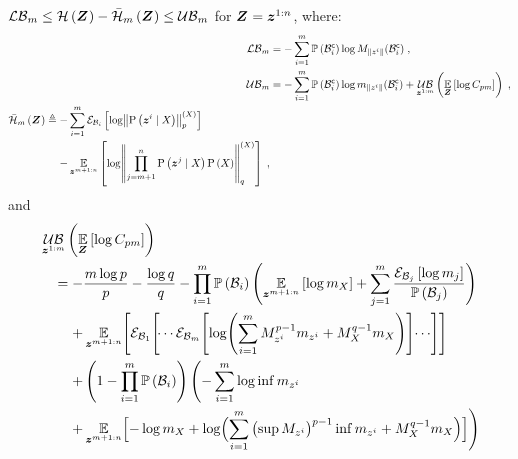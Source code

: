 \begin{proposition}
	\label{thm:normalizer_bounds_struct}
	$\operatorname*{\mathcal{LB}}_m\leq\mathcal{H}\left({\boldsymbol Z_{}}\right) -\bar{\mathcal{H}}_{m}\left({\boldsymbol Z_{}}\right)\leq\operatorname*{\mathcal{UB}}_m$ for $\boldsymbol Z_{}=\boldsymbol z_{}^{1:n}$, where:
	\begin{subequations}
		\begin{align}
			\lowerbound\nolimits_m & =-\sum_{i=1}^m\measure{\stcompI{\subSpace}{i}}\log M_{\norm{\observation{}{i}}}(\stcompI{\subSpace}{i})\;, \\
			\upperbound\nolimits_m & =-\sum_{i=1}^m\measure{\stcompI{\subSpace}{i}}\log m_{\norm{\observation{}{i}}}(\stcompI{\subSpace}{i})+\upperbound_{\observationRV{}{1:m}}\left(\expectation{\log C_{pm}}{\observationsRV{}}\right)\;,\\
			\begin{split}
				\simplentropy{\observationsRV{}}{m} & \triangleq-\sum_{i=1}^m\partialexpectation{\log\pnorm{\probcond{\observationRV{}{i}}{\states{}}}{p}{\states{}}}{\subSpace_i}\\
				&\phantomeq-\expectation{\log\pnorm{\prod_{j=m+1}^n\probcond{\observationRV{}{j}}{\states{}}\prob{\states{}}}{q}{\states{}}}{\observationRV{}{m+1:n}}\;,
			\end{split}
		\end{align}
	\end{subequations}
	and
	\begin{equation}
		\begin{split}
			& \upperbound_{\observationRV{}{1:m}}\left(\expectation{\log C_{pm}}{\observationsRV{}}\right)\\
			& \quad=-\frac{m\log p}{p}-\frac{\log q}{q}
			-\prod_{i=1}^m\measure{\subSpace_i}\Biggl(\expectation{\log m_{\states{}}}{\observationRV{}{m+1:n}}+\sum_{j=1}^m\frac{\partialexpectation{\log m_j}{\subSpace_j}}{\measure{\subSpace_j}}\Biggr) \\
			& \quad\phantomeq+\E_{\observationRV{}{m+1:n}}\Biggl[\partexp_{\subSpace_1}\Biggl[\dotsi\partexp_{\subSpace_m}\Biggl[
			\log \Biggl(\sum_{i=1}^{m} M_{\observation{}{i}}^{p-1}m_{\observation{}{i}}
			+M_{\states{}}^{q-1}m_{\states{}}\Biggr)\Biggr]\dotsi\Biggr]\Biggr]\\
			& \quad\phantomeq+\left(1-\prod_{i=1}^m\measure{\subSpace_i}\right)\Biggl(-\sum_{i=1}^m\log \inf m_{\observation{}{i}}\\
			& \quad\phantomeq+\E_{\observationRV{}{m+1:n}}\Bigl[-\log m_{\states{}}
			+\log\Bigl(\sum_{i=1}^{m}\left(\sup M_{\observation{}{i}}\right)^{p-1}\inf m_{\observation{}{i}}+M_{\states{}}^{q-1}m_{\states{}}\Bigr)\Bigr]\Biggr)
		\end{split}
	\end{equation}
\end{proposition}

